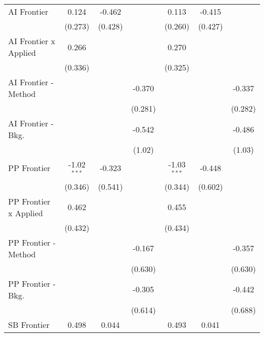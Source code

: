 \begin{tabular}{lcccccc}
   AI Frontier                  & 0.124         & -0.462       &              & 0.113         & -0.415       &   \\   
                                & (0.273)       & (0.428)      &              & (0.260)       & (0.427)      &   \\   
   AI Frontier x Applied        & 0.266         &              &              & 0.270         &              &   \\   
                                & (0.336)       &              &              & (0.325)       &              &   \\   
   AI Frontier - Method         &               &              & -0.370       &               &              & -0.337\\   
                                &               &              & (0.281)      &               &              & (0.282)\\   
   AI Frontier - Bkg.           &               &              & -0.542       &               &              & -0.486\\   
                                &               &              & (1.02)       &               &              & (1.03)\\   
   PP Frontier                  & -1.02$^{***}$ & -0.323       &              & -1.03$^{***}$ & -0.448       &   \\   
                                & (0.346)       & (0.541)      &              & (0.344)       & (0.602)      &   \\   
   PP Frontier x Applied        & 0.462         &              &              & 0.455         &              &   \\   
                                & (0.432)       &              &              & (0.434)       &              &   \\   
   PP Frontier - Method         &               &              & -0.167       &               &              & -0.357\\   
                                &               &              & (0.630)      &               &              & (0.630)\\   
   PP Frontier - Bkg.           &               &              & -0.305       &               &              & -0.442\\   
                                &               &              & (0.614)      &               &              & (0.688)\\   
   SB Frontier                  & 0.498         & 0.044        &              & 0.493         & 0.041        &   \\   

\end{tabular}
